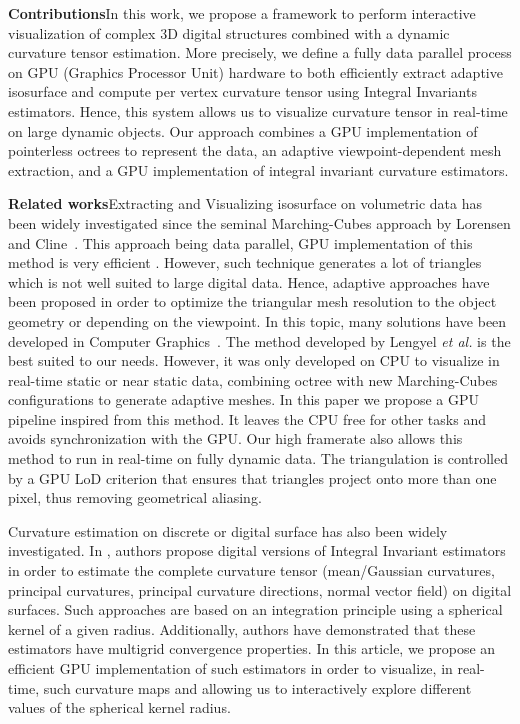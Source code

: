 \documentclass{llncs}
\begin{document}
\noindent\textbf{Contributions}\quad In this work, we propose a framework to
perform interactive visualization of complex 3D digital structures combined with
a dynamic curvature tensor estimation. More precisely, we define a fully data
parallel process on GPU (Graphics Processor Unit) hardware to both efficiently
extract adaptive isosurface and compute per vertex curvature tensor using
Integral Invariants estimators. Hence, this system allows us to visualize
curvature tensor in real-time on large dynamic objects. Our approach combines a
GPU implementation of pointerless octrees to represent the data, an adaptive
viewpoint-dependent mesh extraction, and a GPU implementation of integral
invariant curvature estimators.


\vspace{0.2cm}

\sloppy\noindent\textbf{Related works}\quad Extracting and Visualizing
isosurface on volumetric data has been widely investigated since the
seminal Marching-Cubes approach by Lorensen and
Cline~\cite{lorensen1987marching}. This approach being data parallel,
GPU implementation of this method is very efficient
\cite{tatarchuk2007real}. However, such technique generates a lot of
triangles which is not well suited to large digital data. Hence,
adaptive approaches have been proposed in order to optimize the
triangular mesh resolution to the object geometry or depending on the
viewpoint. In this topic, many solutions have been developed in
Computer
Graphics~\cite{shu1995adaptive,schaefer2004dual,lengyel2010voxel,DBLP:journals/cgf/LewinerMPPL10,DBLP:journals/cvgip/LobelloDD14}.
The method developed by Lengyel \textit{et al.}
\cite{lengyel2010voxel} is the best suited to our needs.  However, it
was only developed on CPU to visualize in real-time static or near
static data, combining octree with new Marching-Cubes configurations
to generate adaptive meshes. In this paper we propose a GPU pipeline
inspired from this method.  It leaves the CPU free for other tasks and
avoids synchronization with the GPU.  Our high framerate also allows
this method to run in real-time on fully dynamic data.  The
triangulation is controlled by a GPU LoD criterion that ensures that
triangles project onto more than one pixel, thus removing geometrical
aliasing.

Curvature estimation on discrete or digital surface has also been
widely investigated. In \cite{CVIU2014}, authors propose digital
versions of Integral Invariant estimators
\cite{Pottmann2007,Pottmann2009} in order to estimate the complete
curvature tensor (mean/Gaussian curvatures, principal curvatures,
principal curvature directions, normal vector field) on digital
surfaces. Such approaches are based on an integration principle using
a spherical kernel of a given radius. Additionally, authors have
demonstrated that these estimators have multigrid convergence
properties. In this article, we propose an efficient GPU
implementation of such estimators in order to visualize, in real-time,
such curvature maps and allowing us to interactively explore different
values of the spherical kernel radius.
\end{document}
